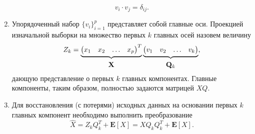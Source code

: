 \documentclass[a4paper]{article}
\begin{document}
\begin{enumerate}
\begin{equation}
        v_i \cdot v_j = \delta_{ij}.
    \end{equation}
    \item Упорядоченный набор $\{v_i\}_{i=1}^p$ представляет собой главные оси. Проекцией изначальной выборки на множество первых $k$ главных осей назовем величину
    \begin{equation}
        Z_k=\underbrace{\begin{pmatrix}x_1&x_2&\hdots&x_p\end{pmatrix}^T}_{\substack{\\[0.2em] \text{\normalsize $\mathbf{X}$}}}\underbrace{\begin{pmatrix}v_1&v_2&\hdots&v_k\end{pmatrix}}_{\substack{\\[0.2em] \text{\normalsize $\mathbf{Q}_k$}}},
    \end{equation}
    дающую представление о первых $k$ главных компонентах. Главные компоненты, таким образом, полностью задаются матрицей $XQ$.
    \item Для восстановления (с потерями) исходных данных на основании первых $k$ главных компонент необходимо выполнить преобразование
    \begin{equation}
        \widehat{X}=Z_k Q_k^T + \mathbf{E}[X]=X Q_k Q_k^T + \mathbf{E}[X].
    \end{equation}
    \end{enumerate}
\end{document}
